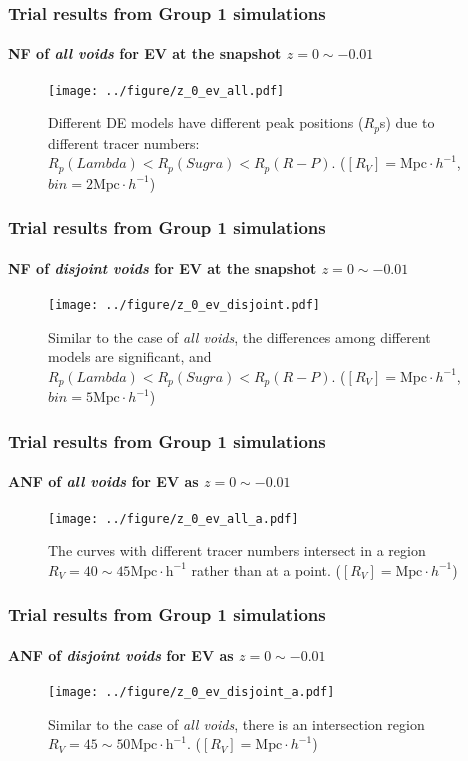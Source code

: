 \documentclass{beamer}
\newtheorem{Narrow down the analysis}{Narrow down the analysis}
\begin{document}
\begin{frame}
	\frametitle{Trial results from Group 1 simulations}
	\framesubtitle{NF of \textit{all voids} for EV at the snapshot $z=0\sim -0.01$}
	\pause 
\begin{figure}
\centering
\texttt{[image: ../figure/z\_0\_ev\_all.pdf]}
\caption{Different DE models have different peak positions ($R_{p}$s) due to different tracer numbers: $R_{p}(Lambda)<R_{p}(Sugra)<R_{p}(R-P)$. ($[R_{V}]=\mathrm{Mpc}\cdot h^{-1}$, $bin=2\mathrm{Mpc}\cdot h^{-1}$)}
\label{3}
\end{figure}
\end{frame}

\begin{frame}
	\frametitle{Trial results from Group 1 simulations}
	\framesubtitle{NF of \textit{disjoint voids} for EV at the snapshot $z=0\sim -0.01$}
	\pause 
\begin{figure}
\centering
\texttt{[image: ../figure/z\_0\_ev\_disjoint.pdf]}
\caption{Similar to the case of \textit{all voids}, the differences among different models are significant, and $R_{p}(Lambda)<R_{p}(Sugra)<R_{p}(R-P)$. ($[R_{V}]=\mathrm{Mpc}\cdot h^{-1}$, $bin=5\mathrm{Mpc}\cdot h^{-1}$)}
\label{4}
\end{figure}
\end{frame}

\begin{frame}
	\frametitle{Trial results from Group 1 simulations}
	\framesubtitle{ANF of \textit{all voids} for EV as $z=0\sim -0.01$}
	\pause 
\begin{figure}
\centering
\texttt{[image: ../figure/z\_0\_ev\_all\_a.pdf]}
\caption{The curves with different tracer numbers intersect in a region $R_{V}=40\sim 45\mathrm{Mpc\cdot h^{-1}}$ rather than at a point. ($[R_{V}]=\mathrm{Mpc}\cdot h^{-1}$)}
\label{5}
\end{figure}
\end{frame}

\begin{frame}
	\frametitle{Trial results from Group 1 simulations}
	\framesubtitle{ANF of \textit{disjoint voids} for EV as $z=0\sim -0.01$}
	\pause 
\begin{figure}
\centering
\texttt{[image: ../figure/z\_0\_ev\_disjoint\_a.pdf]}
\caption{Similar to the case of \textit{all voids}, there is an intersection region $R_{V}=45\sim 50\mathrm{Mpc\cdot h^{-1}}$. ($[R_{V}]=\mathrm{Mpc}\cdot h^{-1}$)}
\label{6}
\end{figure}
\end{frame}
\end{document}
